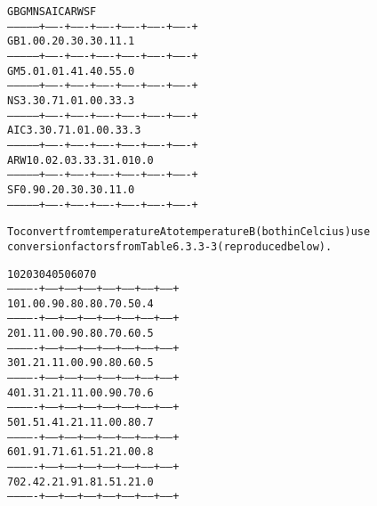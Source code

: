 \begin{boxedminipage}{\funcwidth}
\begin{alltt}
              {\textbar}  GB   {\textbar}  GM   {\textbar}  NS   {\textbar}  AIC  {\textbar}  ARW  {\textbar}  SF   {\textbar}
--------------+-------+-------+-------+-------+-------+-------+
GB            {\textbar}  1.0  {\textbar}  0.2  {\textbar}  0.3  {\textbar}  0.3  {\textbar}  0.1  {\textbar}  1.1  {\textbar}
--------------+-------+-------+-------+-------+-------+-------+
GM            {\textbar}  5.0  {\textbar}  1.0  {\textbar}  1.4  {\textbar}  1.4  {\textbar}  0.5  {\textbar}  5.0  {\textbar}
--------------+-------+-------+-------+-------+-------+-------+
NS            {\textbar}  3.3  {\textbar}  0.7  {\textbar}  1.0  {\textbar}  1.0  {\textbar}  0.3  {\textbar}  3.3  {\textbar}
--------------+-------+-------+-------+-------+-------+-------+
AIC           {\textbar}  3.3  {\textbar}  0.7  {\textbar}  1.0  {\textbar}  1.0  {\textbar}  0.3  {\textbar}  3.3  {\textbar}
--------------+-------+-------+-------+-------+-------+-------+
ARW           {\textbar} 10.0  {\textbar}  2.0  {\textbar}  3.3  {\textbar}  3.3  {\textbar}  1.0  {\textbar} 10.0  {\textbar}
--------------+-------+-------+-------+-------+-------+-------+
SF            {\textbar}  0.9  {\textbar}  0.2  {\textbar}  0.3  {\textbar}  0.3  {\textbar}  0.1  {\textbar}  1.0  {\textbar}
--------------+-------+-------+-------+-------+-------+-------+

To convert from temperature A to temperature B (both in Celcius) use
conversion factors from Table 6.3.3-3 (reproduced below).

             {\textbar}  10  {\textbar}  20  {\textbar}  30  {\textbar}  40  {\textbar}  50  {\textbar}  60  {\textbar}  70  {\textbar}
-------------+------+------+------+------+------+------+------+
10           {\textbar}  1.0 {\textbar}  0.9 {\textbar}  0.8 {\textbar}  0.8 {\textbar}  0.7 {\textbar}  0.5 {\textbar}  0.4 {\textbar}
-------------+------+------+------+------+------+------+------+
20           {\textbar}  1.1 {\textbar}  1.0 {\textbar}  0.9 {\textbar}  0.8 {\textbar}  0.7 {\textbar}  0.6 {\textbar}  0.5 {\textbar}
-------------+------+------+------+------+------+------+------+
30           {\textbar}  1.2 {\textbar}  1.1 {\textbar}  1.0 {\textbar}  0.9 {\textbar}  0.8 {\textbar}  0.6 {\textbar}  0.5 {\textbar}
-------------+------+------+------+------+------+------+------+
40           {\textbar}  1.3 {\textbar}  1.2 {\textbar}  1.1 {\textbar}  1.0 {\textbar}  0.9 {\textbar}  0.7 {\textbar}  0.6 {\textbar}
-------------+------+------+------+------+------+------+------+
50           {\textbar}  1.5 {\textbar}  1.4 {\textbar}  1.2 {\textbar}  1.1 {\textbar}  1.0 {\textbar}  0.8 {\textbar}  0.7 {\textbar}
-------------+------+------+------+------+------+------+------+
60           {\textbar}  1.9 {\textbar}  1.7 {\textbar}  1.6 {\textbar}  1.5 {\textbar}  1.2 {\textbar}  1.0 {\textbar}  0.8 {\textbar}
-------------+------+------+------+------+------+------+------+
70           {\textbar}  2.4 {\textbar}  2.2 {\textbar}  1.9 {\textbar}  1.8 {\textbar}  1.5 {\textbar}  1.2 {\textbar}  1.0 {\textbar}
-------------+------+------+------+------+------+------+------+
\end{alltt}


\end{boxedminipage}
